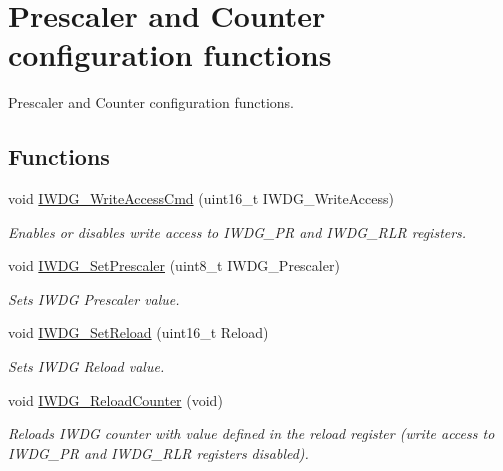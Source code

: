 \hypertarget{group___i_w_d_g___group1}{\section{Prescaler and Counter configuration functions}
\label{group___i_w_d_g___group1}
}


Prescaler and Counter configuration functions.  


\subsection*{Functions}
\begin{DoxyCompactItemize}
\item 
void \hyperlink{group___i_w_d_g___group1_gae466681e5bdc11b353c508b89d75ca05}{I\-W\-D\-G\-\_\-\-Write\-Access\-Cmd} (uint16\-\_\-t I\-W\-D\-G\-\_\-\-Write\-Access)
\begin{DoxyCompactList}\small\item\em Enables or disables write access to I\-W\-D\-G\-\_\-\-P\-R and I\-W\-D\-G\-\_\-\-R\-L\-R registers. \end{DoxyCompactList}\item 
void \hyperlink{group___i_w_d_g___group1_ga4fa7f1cd690533a35ad9e4729c0450a3}{I\-W\-D\-G\-\_\-\-Set\-Prescaler} (uint8\-\_\-t I\-W\-D\-G\-\_\-\-Prescaler)
\begin{DoxyCompactList}\small\item\em Sets I\-W\-D\-G Prescaler value. \end{DoxyCompactList}\item 
void \hyperlink{group___i_w_d_g___group1_gae2a14752a0431f23cb80cebf202ac365}{I\-W\-D\-G\-\_\-\-Set\-Reload} (uint16\-\_\-t Reload)
\begin{DoxyCompactList}\small\item\em Sets I\-W\-D\-G Reload value. \end{DoxyCompactList}\item 
void \hyperlink{group___i_w_d_g___group1_ga7147ebabdc3fef97f532b171a4e70d49}{I\-W\-D\-G\-\_\-\-Reload\-Counter} (void)
\begin{DoxyCompactList}\small\item\em Reloads I\-W\-D\-G counter with value defined in the reload register (write access to I\-W\-D\-G\-\_\-\-P\-R and I\-W\-D\-G\-\_\-\-R\-L\-R registers disabled). \end{DoxyCompactList}\end{DoxyCompactItemize}


